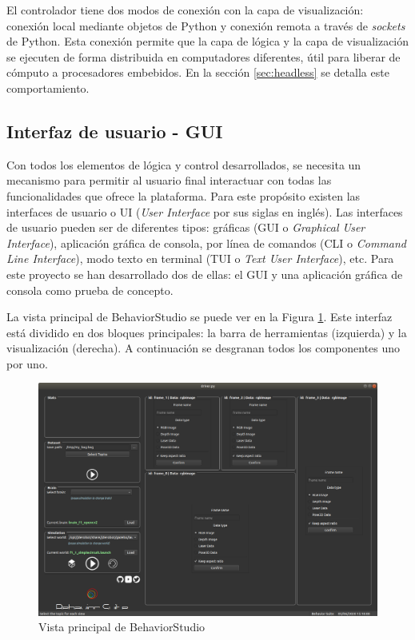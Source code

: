El controlador tiene dos modos de conexión con la capa de visualización: conexión local mediante objetos de Python y conexión remota a través de \textit{sockets} de Python. Esta conexión permite que la capa de lógica y la capa de visualización se ejecuten de forma distribuida en computadores diferentes, útil para liberar de cómputo a procesadores embebidos. En la sección \ref{sec:headless} se detalla este comportamiento.

\subsection{Interfaz de usuario - GUI}
\label{sec:ui}

Con todos los elementos de lógica y control desarrollados, se necesita un mecanismo para permitir al usuario final interactuar con todas las funcionalidades que ofrece la plataforma. Para este propósito existen las interfaces de usuario o UI (\textit{User Interface} por sus siglas en inglés). Las interfaces de usuario pueden ser de diferentes tipos: gráficas (GUI o \textit{Graphical User Interface}), aplicación gráfica de consola, por línea de comandos (CLI o \textit{Command Line Interface}), modo texto en terminal (TUI o \textit{Text User Interface}), etc. Para este proyecto se han desarrollado dos de ellas: el GUI y una aplicación gráfica de consola como prueba de concepto.

La vista principal de BehaviorStudio se puede ver en la Figura \ref{fig:mainview}. Este interfaz está dividido en dos bloques principales: la barra de herramientas (izquierda) y la visualización (derecha). A continuación se desgranan todos los componentes uno por uno.

\begin{figure}
  \centering
  \includegraphics[width=1\linewidth]{img/main_window}
  \caption{Vista principal de BehaviorStudio}
  \label{fig:mainview}
\end{figure}

